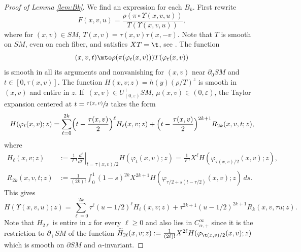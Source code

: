\begin{proof}[Proof of Lemma \ref{lem:Bk}]
We find an expression for each $B_k$. First rewrite
\[
F(x,v,u) = \frac{\rho(\pi\circ\Upsilon(x,v,u))}{T(\Upsilon(x,v,u))},
\]
where for $(x,v)\in SM$, $T(x,v) = \tau(x,v) \tau(x,-v)$. Note that $T$ is smooth on $SM$, even on each fiber, and satisfies
$XT = \t$, see \cite[Lem.\,3.2.11]{Paternain2021}. The function
\begin{equation*}
(x,v,t)\mto \rho(\pi (\varphi_t(x,v)))T(\varphi_t(x,v))
\end{equation*}
is smooth in all its arguments and nonvanishing for $(x,v)$ near $\partial_0 SM$ and $t\in [0,\tau(x,v)]$.
The function $H(x,v; z) = h(y) \left(\rho/T \right)^z$ is smooth in $(x,v)$ and entire in $z$.
If~$(x,v)\in U^+_{(0,\varepsilon)} SM$, \ie $\mu(x,v) \in (0,\varepsilon)$, the Taylor expansion centered at $t = \sfrac{\tau(x,v)}{2}$
takes the form
\begin{equation*}
H(\varphi_t(x,v); z) = \sum_{\ell=0}^{2k} \Bigl(t-\frac{\tau(x,v)}{2} \Bigr)^\ell H_\ell (x,v; z) + \Bigl(t-\frac{\tau(x,v)}{2} \Bigr)^{2k+1}
R_{2k}(x,v,t; z),
\end{equation*}
where
\begin{align*}
H_\ell(x,v; z) &:= \frac{1}{\ell !} \left. \frac{d^\ell}{dt^\ell}\right|_{t=\tau(x,v)/2} H(\varphi_{t}(x,v); z) = \frac{1}{\ell!} X^\ell H (\varphi_{\tau(x,v)/2}(x,v); z), \\
R_{2k} (x,v,t; z) &:= \frac{1}{(2k)!} \int_0^1 (1-s)^{2k} X^{2k+1} H (\varphi_{\tau/2+s(t-\tau/2)}(x,v); z)\,ds.
\end{align*}
This gives
\begin{equation*}
H(\Upsilon(x,v,u); z) = \sum_{\ell=0}^{2k} \tau^\ell (u-1/2)^\ell H_\ell(x,v; z) + \tau^{2k+1} (u-1/2)^{2k+1} R_{k} (x,v,\tau u; z).
\end{equation*}
Note that $H_{2\ell}$ is entire in $z$ for every $\ell \geq 0$ and also lies in $C_{\alpha,+}^\infty$ since it is the restriction to $\partial_+ SM$ of the function $\widetilde{H}_{2\ell} (x,v; z) :=
\frac{1}{(2\ell)!}X^{2\ell}H (\varphi_{\t(x,v)/2}(x,v); z)$ which is smooth on $\partial SM$ and $\alpha$-invariant.


\end{proof}
